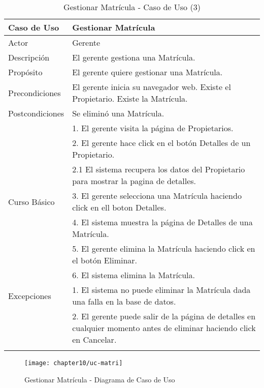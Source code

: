  \begin{longtable}{@{} p{3cm} p{10cm} @{}} \toprule
    \textbf{Caso de Uso}    & Gestionar Matrícula \\ \midrule
    Actor                   & Gerente \\ \cmidrule{1-2}
    Descripción             & El gerente gestiona una Matrícula. \\ \cmidrule{1-2}
    Propósito               & El gerente quiere gestionar una Matrícula. \\ \cmidrule{1-2}
    Precondiciones          & El gerente inicia su navegador web. Existe el Propietario. Existe la Matrícula. \\ \cmidrule{1-2} 
    Postcondiciones         & Se eliminó una Matrícula. \\ \cmidrule{1-2} 
                            & 1. El gerente visita la página de Propietarios. \\ 
                            & 2. El gerente hace click en el botón Detalles de un Propietario. \\
                            & 2.1 El sistema recupera los datos del Propietario para mostrar la pagina de detalles. \\
    Curso Básico            & 3. El gerente selecciona una Matrícula haciendo click en ell boton Detalles. \\
                            & 4. El sistema muestra la página de Detalles de una Matrícula. \\
                            & 5. El gerente elimina la Matrícula haciendo click en el botón Eliminar. \\
                            & 6. El sistema elimina la Matrícula. \\ \cmidrule{1-2}
    Excepciones             & 1. El sistema no puede eliminar la Matrícula dada una falla en la base de datos. \\
                            & 2. El gerente puede salir de la página de detalles en cualquier momento antes de eliminar haciendo click en Cancelar. \\ \bottomrule
   \caption{Gestionar Matrícula - Caso de Uso (3)} \label{tab:tabcu-matri3} \\
   \end{longtable}
  
 
    \begin{figure}[H]
        \centering
        \texttt{[image: chapter10/uc-matri]}
        \caption{Gestionar Matrícula - Diagrama de Caso de Uso}
        \label{fig:uc-matri}
    \end{figure}
    
